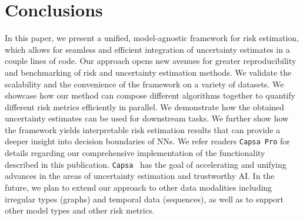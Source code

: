 \documentclass{article} %
\def\Capsa{\texttt{{Capsa}}}
\begin{document}
\section{Conclusions}

In this paper, we present a unified, model-agnostic framework for risk estimation, which allows for seamless and efficient integration of uncertainty estimates in a couple lines of code. Our approach opens new avenues for greater reproducibility and benchmarking of risk and uncertainty estimation methods. We validate the scalability and the convenience of the framework on a variety of datasets. We showcase how our method can compose different algorithms together to quantify different risk metrics efficiently in parallel. We demonstrate how the obtained uncertainty estimates can be used for downstream tasks. We further show how the framework yields interpretable risk estimation results that can provide a deeper insight into decision boundaries of NNs. We refer readers 
\texttt{{Capsa Pro}} \citep{capsa-pro} for details regarding our comprehensive implementation of the functionality described in this publication. \Capsa~ has the goal of accelerating and unifying advances in the areas of uncertainty estimation and trustworthy AI. In the future, we plan to extend our approach to other data modalities including irregular types (graphs) and temporal data (sequences), as well as to support other model types and other risk metrics.









\end{document}

